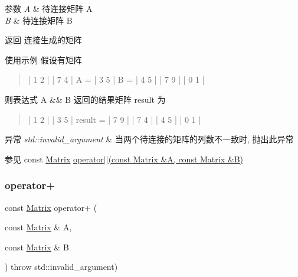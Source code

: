 \begin{DoxyParams}{参数}
{\em A} & 待连接矩阵 A \\
\hline
{\em B} & 待连接矩阵 B \\
\hline
\end{DoxyParams}
\begin{DoxyReturn}{返回}
连接生成的矩阵 
\end{DoxyReturn}
\begin{DoxyParagraph}{使用示例}
假设有矩阵~\newline
\begin{quote}
\begin{DoxyVerb}    | 1 2 |          | 7 4 |
A = | 3 5 |      B = | 4 5 |
    | 7 9 |          | 0 1 |
\end{DoxyVerb}


\end{quote}
则表达式 A \&\& B 返回的结果矩阵 result 为~\newline
\begin{quote}
\begin{DoxyVerb}         | 1 2 |
         | 3 5 |
result = | 7 9 |
         | 7 4 |
         | 4 5 |
         | 0 1 |
\end{DoxyVerb}


\end{quote}

\end{DoxyParagraph}

\begin{DoxyExceptions}{异常}
{\em std\+::invalid\+\_\+argument} & 当两个待连接的矩阵的列数不一致时, 抛出此异常 \\
\hline
\end{DoxyExceptions}
\begin{DoxySeeAlso}{参见}
const \hyperlink{classkerbal_1_1math_1_1_matrix}{Matrix} \hyperlink{classkerbal_1_1math_1_1_matrix_aaa58ea23f11a2f1ad42b487f9a6d0245}{operator$\vert$$\vert$(const Matrix \&\+A, const Matrix \&\+B)} 
\end{DoxySeeAlso}
\mbox{\label{classkerbal_1_1math_1_1_matrix_a68ca5b1d7d0aaf615a63771788562210}} 
\subsubsection{\texorpdfstring{operator+}{operator+}}
{\footnotesize\ttfamily const \hyperlink{classkerbal_1_1math_1_1_matrix}{Matrix} operator+ (\begin{DoxyParamCaption}\item[{const \hyperlink{classkerbal_1_1math_1_1_matrix}{Matrix} \&}]{A,  }\item[{const \hyperlink{classkerbal_1_1math_1_1_matrix}{Matrix} \&}]{B }\end{DoxyParamCaption}) throw  std\+::invalid\+\_\+argument) \hspace{0.3cm}{\ttfamily [friend]}}



